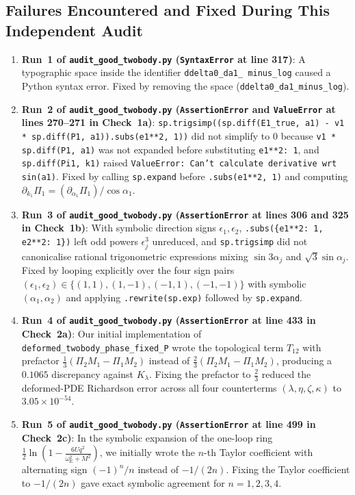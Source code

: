 \documentclass[11pt,a4paper]{article}
\begin{document}
\subsection{Failures Encountered and Fixed During This Independent Audit}
\begin{enumerate}
\item \textbf{Run~1 of \texttt{audit\_good\_twobody.py} (\texttt{SyntaxError} at line 317)}: A typographic space inside the identifier \texttt{ddelta0\_da1\_ minus\_log} caused a Python syntax error. Fixed by removing the space (\texttt{ddelta0\_da1\_minus\_log}).
\item \textbf{Run~2 of \texttt{audit\_good\_twobody.py} (\texttt{AssertionError} and \texttt{ValueError} at lines 270--271 in Check~1a)}: \texttt{sp.trigsimp((sp.diff(E1\_true, a1) - v1 * sp.diff(P1, a1)).subs(e1**2, 1))} did not simplify to $0$ because \texttt{v1 * sp.diff(P1, a1)} was not expanded before substituting \texttt{e1**2: 1}, and \texttt{sp.diff(Pi1, k1)} raised \texttt{ValueError: Can't calculate derivative wrt sin(a1)}. Fixed by calling \texttt{sp.expand} before \texttt{.subs(e1**2, 1)} and computing $\partial_{k_1}\Pi_1 = (\partial_{\alpha_1}\Pi_1)/\cos\alpha_1$.
\item \textbf{Run~3 of \texttt{audit\_good\_twobody.py} (\texttt{AssertionError} at lines 306 and 325 in Check~1b)}: With symbolic direction signs $\epsilon_1,\epsilon_2$, \texttt{.subs(\{e1**2: 1, e2**2: 1\})} left odd powers $\epsilon_j^3$ unreduced, and \texttt{sp.trigsimp} did not canonicalise rational trigonometric expressions mixing $\sin 3\alpha_j$ and $\sqrt{3}\sin\alpha_j$. Fixed by looping explicitly over the four sign pairs $(\epsilon_1,\epsilon_2)\in\{(1,1),(1,-1),(-1,1),(-1,-1)\}$ with symbolic $(\alpha_1,\alpha_2)$ and applying \texttt{.rewrite(sp.exp)} followed by \texttt{sp.expand}.
\item \textbf{Run~4 of \texttt{audit\_good\_twobody.py} (\texttt{AssertionError} at line 433 in Check~2a)}: Our initial implementation of \texttt{deformed\_twobody\_phase\_fixed\_P} wrote the topological term $T_{12}$ with prefactor $\frac{1}{3}(\Pi_2 M_1 - \Pi_1 M_2)$ instead of $\frac{2}{3}(\Pi_2 M_1 - \Pi_1 M_2)$, producing a $0.1065$ discrepancy against $K_\lambda$. Fixing the prefactor to $\frac{2}{3}$ reduced the deformed-PDE Richardson error across all four counterterms $(\lambda,\eta,\zeta,\kappa)$ to $3.05\times 10^{-54}$.
\item \textbf{Run~5 of \texttt{audit\_good\_twobody.py} (\texttt{AssertionError} at line 499 in Check~2c)}: In the symbolic expansion of the one-loop ring $\frac{1}{2}\ln(1 - \frac{6Uq^2}{\omega_{\mathrm{E}}^2+M^2})$, we initially wrote the $n$-th Taylor coefficient with alternating sign $(-1)^n/n$ instead of $-1/(2n)$. Fixing the Taylor coefficient to $-1/(2n)$ gave exact symbolic agreement for $n=1,2,3,4$.

\end{enumerate}
\end{document}
